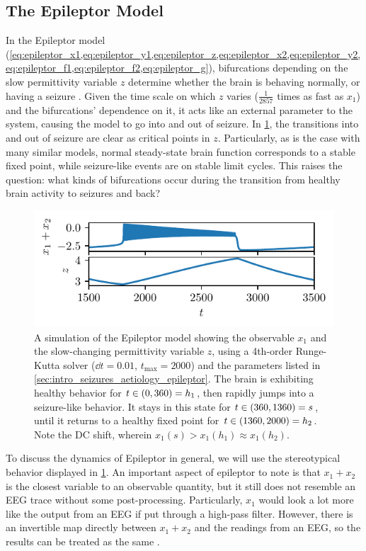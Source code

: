 \subsection{The Epileptor Model}
\label{sec:lit_review_bifurcation_epileptor}
In the Epileptor model (\cref{eq:epileptor_x1,eq:epileptor_y1,eq:epileptor_z,eq:epileptor_x2,eq:epileptor_y2,eq:epileptor_f1,eq:epileptor_f2,eq:epileptor_g}), bifurcations depending on the slow permittivity variable $z$ determine whether the brain is behaving normally, or having a seizure \cite{Jirsa2014}.
Given the time scale on which $z$ varies ($\frac{1}{2857}$ times as fast as $x_{1}$) and the bifurcations' dependence on it, it acts like an external parameter to the system, causing the model to go into and out of seizure.
In \cref{fig:epileptor}, the transitions into and out of seizure are clear as critical points in $z$.
Particularly, as is the case with many similar models, normal steady-state brain function corresponds to a stable fixed point, while seizure-like events are on stable limit cycles.
This raises the question: what kinds of bifurcations occur during the transition from healthy brain activity to seizures and back?
\begin{figure}[ht]
  \centering
  \includegraphics{figure/epileptor}
  \caption[Epileptor simulation]{A simulation of the Epileptor model showing the observable $x_{1}$ and the slow-changing permittivity variable $z$, using a 4th-order Runge-Kutta solver ($\dd{t} = 0.01$, $t_{\text{max}} = 2000$) and the parameters listed in \cref{sec:intro_seizures_aetiology_epileptor}.
    The brain is exhibiting healthy behavior for $t \in \pqty{0, 360} = h_{1}$, then rapidly jumps into a seizure-like behavior.
    It stays in this state for $t \in \pqty{360, 1360} = s$, until it returns to a healthy fixed point for $t \in \pqty{1360, 2000} = h_{2}$.
    Note the DC shift, wherein $x_{1}(s) > x_{1}(h_{1}) \approx x_{1}(h_{2})$.
  }
  \label{fig:epileptor}
\end{figure}

To discuss the dynamics of Epileptor in general, we will use the stereotypical behavior displayed in \cref{fig:epileptor}.
An important aspect of epileptor to note is that $x_{1} + x_{2}$ is the closest variable to an observable quantity, but it still does not resemble an EEG trace without some post-processing.
Particularly, $x_{1}$ would look a lot more like the output from an EEG if put through a high-pass filter.
However, there is an invertible map directly between $x_{1} + x_{2}$ and the readings from an EEG, so the results can be treated as the same \cite{Jirsa2014}.

